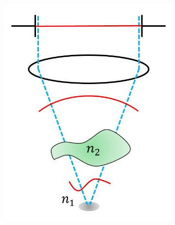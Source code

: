 \begin{figure}[h]
\begin{subfigure}[t]{0.3\textwidth}
		\includegraphics[width=\linewidth]{images/wavefront_focus_aberrated.jpg}
		\caption{}
		\label{fig:wavefront_focus_aberrated}
	\end{subfigure}
	\begin{subfigure}[t]{0.3\textwidth}
		\centering

\end{subfigure}
\end{figure}
